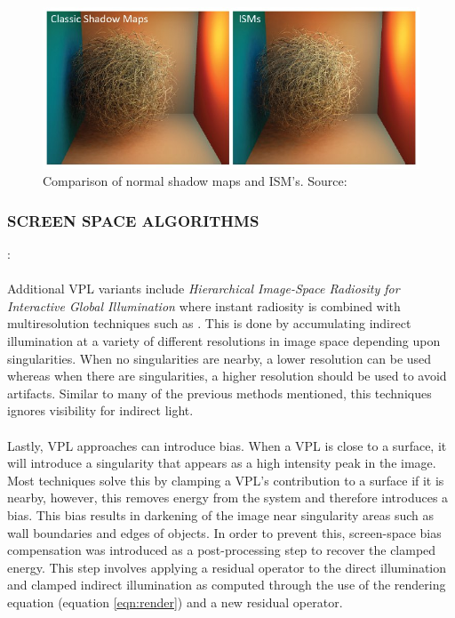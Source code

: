 \begin{figure}[h!]
  \centering
    \includegraphics[width=1.0\textwidth]{ISMcompare.jpg}
  \caption{Comparison of normal shadow maps and ISM's. Source: \protect\cite{Ritschel2008}}
	\label{fig:ISMcompare}
\end{figure}

\subsubsection{SCREEN SPACE ALGORITHMS}: 
\paragraph{}
Additional VPL variants include \textit{Hierarchical Image-Space Radiosity for Interactive Global Illumination} \cite{Nichols2009} where instant radiosity is combined with multiresolution techniques such as \cite{Nichols2009a}.  This is done by accumulating indirect illumination at a variety of different resolutions in image space depending upon singularities.  When no singularities are nearby, a lower resolution can be used whereas when there are singularities, a higher resolution should be used to avoid artifacts.  Similar to many of the previous methods mentioned, this techniques ignores visibility for indirect light.

\paragraph{}
Lastly, VPL approaches can introduce bias.  When a VPL is close to a surface, it will introduce a singularity that appears as a high intensity peak in the image.  Most techniques solve this by clamping a VPL's contribution to a surface if it is nearby, however, this removes energy from the system and therefore introduces a bias.  This bias results in darkening of the image near singularity areas such as wall boundaries and edges of objects.  In order to prevent this, screen-space bias compensation \cite{Novak2011} was introduced as a post-processing step to recover the clamped energy.  This step involves applying a residual operator to the direct illumination and clamped indirect illumination as computed through the use of the rendering equation (equation \ref{eqn:render}) and a new residual operator.

